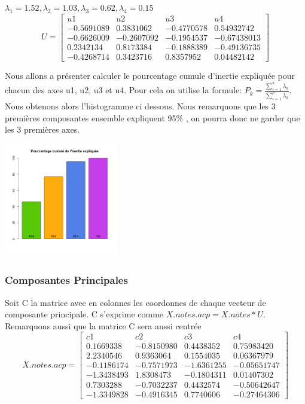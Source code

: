 \documentclass[10pt]{article}
\begin{document}
	\begin{center}
		$\lambda_{1}=	1.52 , \lambda_{2}= 1.03, \lambda_{3}= 0.62 , \lambda_{4}= 0.15$
		\[
		U=
		\begin{bmatrix}
		u1	& u2	& u3 &	u4\\
		-0.5691089	& 0.3831062	& -0.4770578 &	0.54932742\\
		-0.6626009	& -0.2607092 &	-0.1954537  &	-0.67438013\\
		0.2342134 & 	0.8173384	&  -0.1888389 & 	-0.49136735\\
		-0.4268714 &	0.3423716 &	0.8357952 &	0.04482142
		\end{bmatrix}
		\]
	\end{center}
	Nous allons a présenter calculer le pourcentage cumule d'inertie expliquée pour chacun des axes u1, u2, u3 et u4. Pour cela on utilise la formule: $P_{k}= \frac{\sum_{i=1}^{k} \lambda_{k}}{\sum_{i=1}^{p} \lambda_{k}}$. Nous obtenons alors l'histogramme ci dessous. Nous remarquons que les 3 premières composantes ensemble expliquent  95\% , on pourra donc ne garder que les 3 premières axes.
	\begin{center}
		\includegraphics[width=50mm]{Figures/Notes_PCA/pourcentage_inertie.png}
		\label{fig:boxplot_crabs_quantitatives}
	\end{center}	
	
	\subsubsection{Composantes Principales}
	Soit C la matrice avec en colonnes les coordonnes de chaque vecteur de composante principale. C s'exprime comme $X.notes.acp = X.notes * U$. Remarquons aussi que la matrice C sera aussi centrée
	\[
	X.notes.acp=
	\begin{bmatrix}
	c1	& c2	& c3 &	c4\\
	0.1669338 &	-0.8150980	& 0.4438352	& 0.75983420\\
	2.2340546	& 0.9363064	& 0.1554035	& 0.06367979\\
	-0.1186174 &	-0.7571973	& -1.6361255	& -0.05651747\\
	-1.3438493 &	1.8308473 &	-0.1804311 &	0.01407302\\
	0.7303288 &	-0.7032237 &	0.4432574 &	-0.50642647\\
	-1.3349828	& -0.4916345 &	0.7740606 &	-0.27464306
	\end{bmatrix}
	\]
	
\end{document}
